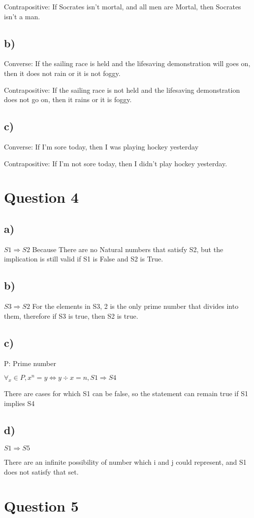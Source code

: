 \documentclass[11pt, oneside]{article}   	%
\begin{document}
\noindent Contrapositive: If Socrates isn't mortal, and all men are Mortal, then Socrates isn't a man. 
\subsection{b)}
Converse: If the sailing race is held and the lifesaving demonstration
will goes on, then it does not rain or it is not foggy.

\noindent Contrapositive: If the sailing race is not held and the lifesaving demonstration
does not go on, then it rains or it is foggy.
\subsection{c)}
Converse: If I'm sore today, then I was playing hockey yesterday

\noindent Contrapositive: If I'm not sore today, then I didn't play hockey yesterday.
\section{Question 4}
\subsection{a)}
$S1 \Rightarrow S2 $ Because There are no Natural numbers that satisfy S2, but the implication is still valid if S1 is False and S2 is True.
\subsection{b)}
$S3 \Rightarrow S2 $ For the elements in S3, 2 is the only prime number that divides into them, therefore if S3 is true, then S2 is true. 
\subsection{c)}
P: Prime number

$\forall_x \in P, x^n = y \Leftrightarrow y \div x = n, S1 \Rightarrow S4 $ 

There are cases for which S1 can be false, so the statement can remain true if S1 implies S4
\subsection{d)}
$S1 \Rightarrow S5 $

There are an infinite possibility of number which i and j could represent, and S1 does not satisfy that set. 
\section{Question 5}
\end{document}
